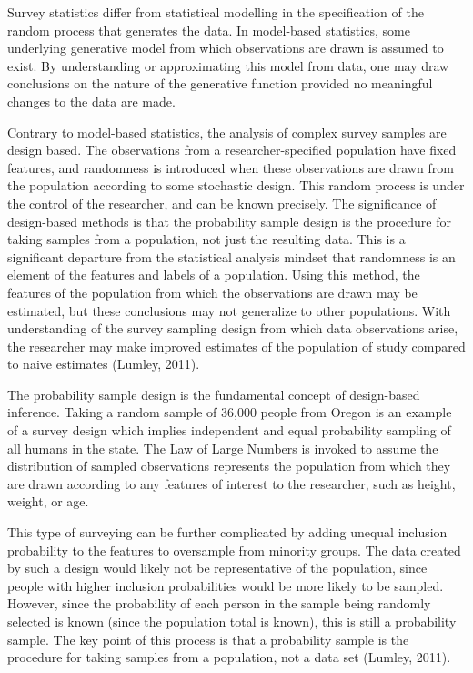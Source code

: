 \documentclass[12pt,twoside]{reedthesis}
\begin{document}
Survey statistics differ from statistical modelling in the specification
of the random process that generates the data. In model-based
statistics, some underlying generative model from which observations are
drawn is assumed to exist. By understanding or approximating this model
from data, one may draw conclusions on the nature of the generative
function provided no meaningful changes to the data are made.

Contrary to model-based statistics, the analysis of complex survey
samples are design based. The observations from a researcher-specified
population have fixed features, and randomness is introduced when these
observations are drawn from the population according to some stochastic
design. This random process is under the control of the researcher, and
can be known precisely. The significance of design-based methods is that
the probability sample design is the procedure for taking samples from a
population, not just the resulting data. This is a significant departure
from the statistical analysis mindset that randomness is an element of
the features and labels of a population. Using this method, the features
of the population from which the observations are drawn may be
estimated, but these conclusions may not generalize to other
populations. With understanding of the survey sampling design from which
data observations arise, the researcher may make improved estimates of
the population of study compared to naive estimates (Lumley, 2011).

The probability sample design is the fundamental concept of design-based
inference. Taking a random sample of 36,000 people from Oregon is an
example of a survey design which implies independent and equal
probability sampling of all humans in the state. The Law of Large
Numbers is invoked to assume the distribution of sampled observations
represents the population from which they are drawn according to any
features of interest to the researcher, such as height, weight, or age.

This type of surveying can be further complicated by adding unequal
inclusion probability to the features to oversample from minority
groups. The data created by such a design would likely not be
representative of the population, since people with higher inclusion
probabilities would be more likely to be sampled. However, since the
probability of each person in the sample being randomly selected is
known (since the population total is known), this is still a probability
sample. The key point of this process is that a probability sample is
the procedure for taking samples from a population, not a data set
(Lumley, 2011).
\end{document}
